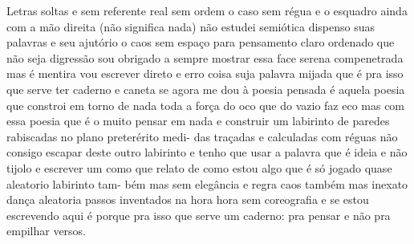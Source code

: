 \begingroup
\huge
\begin{poem}
\begin{stanza}
Letras soltas\verseline
\qquad \quad e sem\verseline
\qquad referente real\verseline
\qquad \quad sem ordem\verseline
\qquad o caso\verseline
\qquad \qquad sem régua\verseline
\qquad e o esquadro\verseline
\qquad \qquad ainda com a mão direita\verseline
(não significa nada)\verseline
\qquad não estudei semiótica\verseline
dispenso suas palavras\verseline
\qquad e seu ajutório\verseline
\qquad \qquad \qquad o caos\verseline
sem espaço para pensamento claro ordenado\verseline
que não seja digressão\verseline
sou obrigado a sempre mostrar essa face\verseline
serena \quad compenetrada mas é mentira\verseline
vou escrever direto e erro \quad coisa suja\verseline
palavra mijada que é pra isso que serve\verseline
ter caderno e caneta\verseline
\qquad \qquad \qquad se agora me dou à poesia\verseline
pensada \quad é aquela poesia que constroi\verseline
em torno de nada \quad toda a força do oco\verseline
que do vazio faz eco \quad mas com essa\verseline
poesia \quad que é o muito pensar em nada\verseline
e construir um labirinto \quad de paredes\verseline
rabiscadas no plano preterérito \quad medi-\verseline
das traçadas e calculadas com réguas\verseline
\qquad \qquad \qquad \qquad \qquad \qquad \qquad não\verseline
consigo escapar deste outro labirinto\verseline
e tenho que usar a palavra que é ideia\verseline
e não tijolo e escrever um como que\verseline
relato de como estou \quad algo que é só\verseline
jogado \quad quase aleatorio \quad labirinto tam-\verseline
bém \quad mas sem elegância e regra\verseline
\qquad caos também \qquad mas inexato\verseline
dança aleatoria \quad passos inventados na hora\verseline
hora \quad sem coreografia\verseline
\qquad \qquad \qquad \qquad \qquad \qquad \qquad e\verseline
se estou escrevendo aqui é porque pra isso\verseline
que serve um caderno: pra pensar e não\verseline
pra empilhar versos.
\end{stanza}
\end{poem}
\endgroup